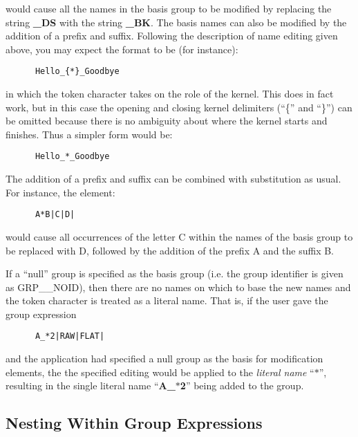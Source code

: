 would cause all the names in the basis group to be modified by replacing the
string {\bf \_DS} with the string {\bf \_BK}. The basis names can also be
modified by the addition of a prefix and suffix. Following the description of
name editing given above, you may expect the format to be (for instance):

\small
\begin{verbatim}
      Hello_{*}_Goodbye
\end{verbatim}
\normalsize

in which the token character takes on the role of the kernel. This does in fact
work, but in this case the opening and closing kernel delimiters (``\{'' and
``\}'') can be omitted because there is no ambiguity about where the kernel
starts and finishes. Thus a simpler form would be:

\small
\begin{verbatim}
      Hello_*_Goodbye
\end{verbatim}
\normalsize

The addition of a prefix and suffix can be combined with substitution as
usual. For instance, the element:

\small
\begin{verbatim}
      A*B|C|D|
\end{verbatim}
\normalsize

would cause all occurrences of the letter C within the names of the basis group
to be replaced with D, followed by the addition of the prefix A and the suffix
B.

If a ``null'' group is specified as the basis group (i.e. the group identifier
is given as GRP\_\_NOID), then there are no
names on which to base the new names and the token character is treated as a
literal name. That is, if the user gave the group expression

\small
\begin{verbatim}
      A_*2|RAW|FLAT|
\end{verbatim}
\normalsize

and the application had specified a null group as the basis for modification
elements, the the specified editing would be applied to the {\em literal name}
``$*$'', resulting in the single literal name ``{\bf A\_$*$2}'' being added to the
group.

\subsection{\label{SEC:NEST}Nesting Within Group Expressions}

